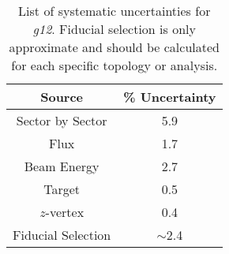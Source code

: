 \begin{table}[htbp]
\begin{minipage}{\columnwidth}
\begin{center}
\begin{singlespacing}

\caption[Systematic Uncertainties]{\label{tab:sysematic.uncertainties}List of systematic uncertainties for \textit{g12}. Fiducial selection is only approximate and should be calculated for each specific topology or analysis.}

\begin{tabular}{cc}

\hline \hline

Source & \% Uncertainty \\

\hline

Sector by Sector & 5.9 \\
Flux & 1.7 \\
Beam Energy & 2.7 \\
Target & 0.5 \\
$z$-vertex & 0.4 \\
Fiducial Selection & $\sim$2.4 \\

\hline \hline

\end{tabular}

\end{singlespacing}
\end{center}
\end{minipage}
\end{table}

